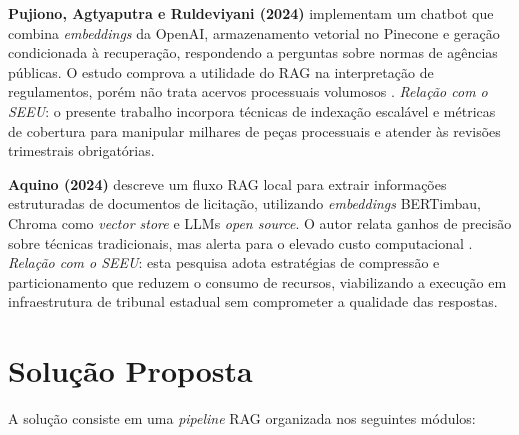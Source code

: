 \textbf{Pujiono, Agtyaputra e Ruldeviyani (2024)} implementam um chatbot que combina \textit{embeddings} da OpenAI, armazenamento vetorial no Pinecone e geração condicionada à recuperação, respondendo a perguntas sobre normas de agências públicas. O estudo comprova a utilidade do RAG na interpretação de regulamentos, porém não trata acervos processuais volumosos \cite{pujiono2024implementing}.  
\emph{Relação com o SEEU}: o presente trabalho incorpora técnicas de indexação escalável e métricas de cobertura para manipular milhares de peças processuais e atender às revisões trimestrais obrigatórias.

\textbf{Aquino (2024)} descreve um fluxo RAG local para extrair informações estruturadas de documentos de licitação, utilizando \textit{embeddings} BERTimbau, Chroma como \textit{vector store} e LLMs \textit{open source}. O autor relata ganhos de precisão sobre técnicas tradicionais, mas alerta para o elevado custo computacional \cite{aquino2024extracting}.  
\emph{Relação com o SEEU}: esta pesquisa adota estratégias de compressão e particionamento que reduzem o consumo de recursos, viabilizando a execução em infraestrutura de tribunal estadual sem comprometer a qualidade das respostas.


\section{Solução Proposta}
\label{sub:solucao-proposta}

A solução consiste em uma \textit{pipeline} RAG organizada nos seguintes módulos:

